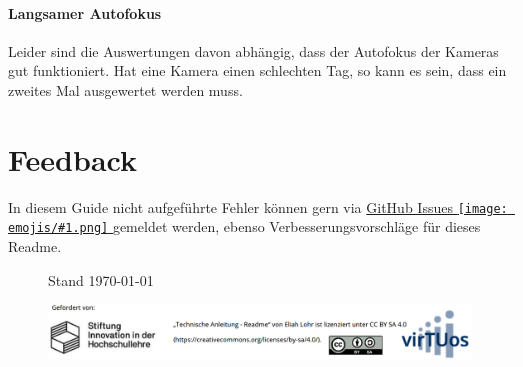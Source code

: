 \documentclass[a4paper, 10pt]{article}
\newcommand{\emoji}[1]{
    \begingroup\normalfont
    \texttt{[image: emojis/\#1.png]}
    \endgroup
}
\begin{document}
\paragraph{Langsamer Autofokus}
Leider sind die Auswertungen davon abhängig, dass der Autofokus der Kameras gut funktioniert. Hat eine Kamera einen schlechten Tag, so kann es sein, dass ein zweites Mal ausgewertet werden muss.


\section{Feedback}
In diesem Guide nicht aufgeführte Fehler können gern via \href{https://github.com/LeLoomi/hybparc_aruco/issues}{GitHub Issues\emoji{link}} gemeldet werden, ebenso Verbesserungsvorschläge für dieses Readme.


\begin{figure}[b]
    \begin{flushleft}
        \hspace*{7.4mm}
        {\footnotesize Stand \today}
    \end{flushleft}
    \vspace{-3.3mm}
    \centering
    \includegraphics[width=14.61cm]{funding+license.png}
\end{figure}
\end{document}
